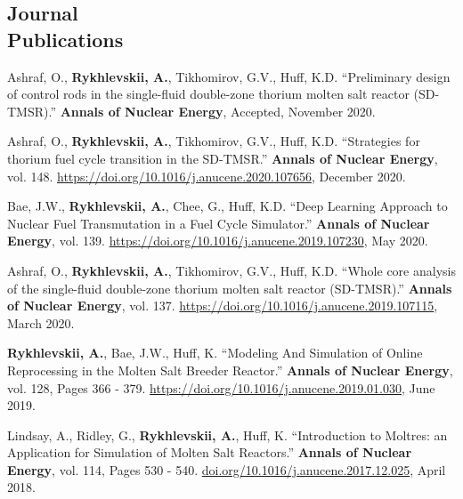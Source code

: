 \documentclass[margin,line]{resume}
\begin{document}
\begin{resume}
    \section{\mysidestyle Journal\\Publications}
      \begin{bibenum}
        \item Ashraf, O., \textbf{Rykhlevskii, A.}, Tikhomirov, G.V., Huff, 
      	K.D. ``Preliminary design of control rods in the single-fluid 
      	double-zone thorium molten salt reactor (SD-TMSR).''
      	\textbf{Annals of Nuclear Energy}, Accepted, November 
      	2020.	
	    \item Ashraf, O., \textbf{Rykhlevskii, A.}, Tikhomirov, G.V., Huff, 
		K.D. ``Strategies for thorium fuel cycle transition in the SD-TMSR.''
		\textbf{Annals of Nuclear Energy}, vol. 148. 
		\url{https://doi.org/10.1016/j.anucene.2020.107656}, December 
		2020.   	
 		\item Bae, J.W., \textbf{Rykhlevskii, A.}, Chee, G., Huff, K.D. ``Deep 
		 Learning Approach to Nuclear Fuel Transmutation in a Fuel Cycle 
		 Simulator.'' \textbf{Annals of Nuclear Energy}, vol. 139. 
		 \url{https://doi.org/10.1016/j.anucene.2019.107230}, May 2020.
	    \item Ashraf, O., \textbf{Rykhlevskii, A.}, Tikhomirov, G.V., Huff, 
		K.D. ``Whole core analysis of the single-fluid double-zone thorium 
		molten salt reactor (SD-TMSR).'' \textbf{Annals of Nuclear Energy}, 
		vol. 137. \url{https://doi.org/10.1016/j.anucene.2019.107115}, March 
		2020.
	    \item \textbf{Rykhlevskii, A.}, Bae, J.W., Huff, K. ``Modeling And 
	    Simulation of Online Reprocessing in the Molten Salt Breeder 
	    Reactor.'' \textbf{Annals of Nuclear Energy}, vol. 128, Pages 366 - 
	    379. \url{https://doi.org/10.1016/j.anucene.2019.01.030}, June 2019.
       \item Lindsay, A., Ridley, G., \textbf{Rykhlevskii, A.}, Huff, K. ``Introduction to 
               Moltres: an Application for Simulation of Molten Salt 
               Reactors.''  \textbf{Annals of Nuclear Energy}, vol. 114, Pages 
               530 - 540. \url{doi.org/10.1016/j.anucene.2017.12.025}, April 
               2018.
      \end{bibenum}
\vspace{2mm} %
	

\end{resume}
\end{document}
